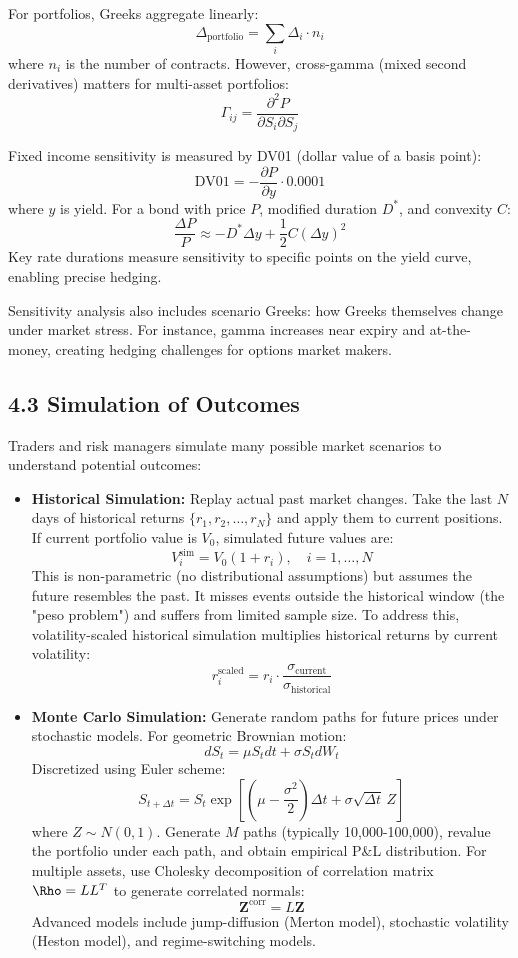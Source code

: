 \documentclass[11pt,a4paper]{article}
\begin{document}
For portfolios, Greeks aggregate linearly:
\[
\Delta_{\text{portfolio}} = \sum_i \Delta_i \cdot n_i
\]
where $n_i$ is the number of contracts. However, cross-gamma (mixed second derivatives) matters for multi-asset portfolios:
\[
\Gamma_{ij} = \frac{\partial^2 P}{\partial S_i \partial S_j}
\]

Fixed income sensitivity is measured by DV01 (dollar value of a basis point):
\[
\text{DV01} = -\frac{\partial P}{\partial y} \cdot 0.0001
\]
where $y$ is yield. For a bond with price $P$, modified duration $D^*$, and convexity $C$:
\[
\frac{\Delta P}{P} \approx -D^* \Delta y + \frac{1}{2}C(\Delta y)^2
\]
Key rate durations measure sensitivity to specific points on the yield curve, enabling precise hedging.

Sensitivity analysis also includes scenario Greeks: how Greeks themselves change under market stress. For instance, gamma increases near expiry and at-the-money, creating hedging challenges for options market makers.

\subsection*{4.3 Simulation of Outcomes}

Traders and risk managers simulate many possible market scenarios to understand potential outcomes:
\begin{itemize}
    \item \textbf{Historical Simulation:} Replay actual past market changes. Take the last $N$ days of historical returns $\{r_1, r_2, \ldots, r_N\}$ and apply them to current positions. If current portfolio value is $V_0$, simulated future values are:
    \[
    V_i^{\text{sim}} = V_0(1 + r_i), \quad i = 1, \ldots, N
    \]
    This is non-parametric (no distributional assumptions) but assumes the future resembles the past. It misses events outside the historical window (the "peso problem") and suffers from limited sample size. To address this, volatility-scaled historical simulation multiplies historical returns by current volatility:
    \[
    r_i^{\text{scaled}} = r_i \cdot \frac{\sigma_{\text{current}}}{\sigma_{\text{historical}}}
    \]
    
    \item \textbf{Monte Carlo Simulation:} Generate random paths for future prices under stochastic models. For geometric Brownian motion:
    \[
    dS_t = \mu S_t dt + \sigma S_t dW_t
    \]
    Discretized using Euler scheme:
    \[
    S_{t+\Delta t} = S_t \exp\left[\left(\mu - \frac{\sigma^2}{2}\right)\Delta t + \sigma\sqrt{\Delta t}\,Z\right]
    \]
    where $Z \sim N(0,1)$. Generate $M$ paths (typically 10,000-100,000), revalue the portfolio under each path, and obtain empirical P\&L distribution. For multiple assets, use Cholesky decomposition of correlation matrix $\Rho = LL^T$ to generate correlated normals:
    \[
    \mathbf{Z}^{\text{corr}} = L\mathbf{Z}
    \]
    Advanced models include jump-diffusion (Merton model), stochastic volatility (Heston model), and regime-switching models.
\end{itemize}
\end{document}
